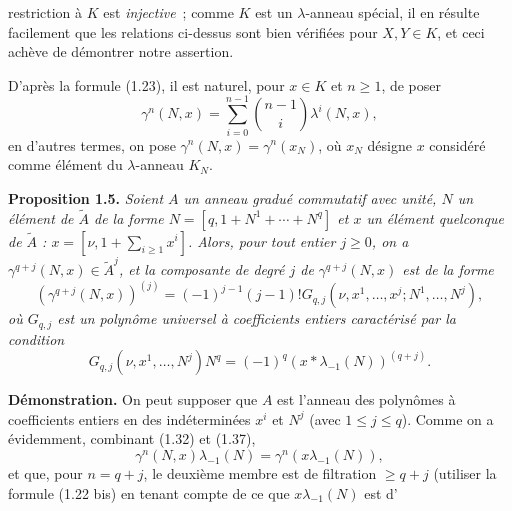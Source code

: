 restriction à $K$ est \emph{injective}~; comme $K$ est un $\lambda$-anneau spécial, il en résulte facilement que les relations ci-dessus sont bien vérifiées pour $X,Y\in K$, et ceci achève de démontrer notre assertion.

D'après la formule (1.23), il est naturel, pour $x\in K$ et $n\geq1$, de poser
\begin{equation}\tag{1.37}
\gamma^n(N,x)=\sum_{i=0}^{n-1}\binom{n-1}{i}\lambda^i(N,x),
\end{equation}
en d'autres termes, on pose $\gamma^n(N,x)=\gamma^n(x_N)$, où $x_N$ désigne $x$ considéré comme élément du $\lambda$-anneau $K_N$.

\textbf{Proposition 1.5.} \emph{Soient $A$ un anneau gradué commutatif avec unité, $N$ un élément de $\widetilde A$ de la forme $N=[q,1+N^1+\cdots+N^q]$ et $x$ un élément quelconque de $\widetilde A$ : $x=[\nu,1+\sum_{i\geq1}x^i]$. Alors, pour tout entier $j\geq0$, on a $\gamma^{q+j}(N,x)\in\widetilde A^j$, et la composante de degré $j$ de $\gamma^{q+j}(N,x)$ est de la forme}
\begin{equation}\tag{1.38}
\left(\gamma^{q+j}(N,x)\right)^{(j)}=(-1)^{j-1}(j-1)!G_{q,j}(\nu,x^1,\ldots,x^j;N^1,\ldots,N^j),
\end{equation}
\emph{où $G_{q,j}$ est un polynôme universel à coefficients entiers caractérisé par la condition}
\begin{equation}\tag{1.39}
G_{q,j}(\nu,x^1,\ldots,N^j)N^q=(-1)^q(x*\lambda_{-1}(N))^{(q+j)}.
\end{equation}

\textbf{Démonstration.} On peut supposer que $A$ est l'anneau des polynômes à coefficients entiers en des indéterminées $x^i$ et $N^j$ (avec $1\leq j\leq q$). Comme on a évidemment, combinant (1.32) et (1.37),
\begin{equation}\tag{1.40}
\gamma^n(N,x)\lambda_{-1}(N)=\gamma^n(x\lambda_{-1}(N)),
\end{equation}
et que, pour $n=q+j$, le deuxième membre est de filtration $\geq q+j$ (utiliser la formule (1.22 bis) en tenant compte de ce que $x\lambda_{-1}(N)$ est d'
